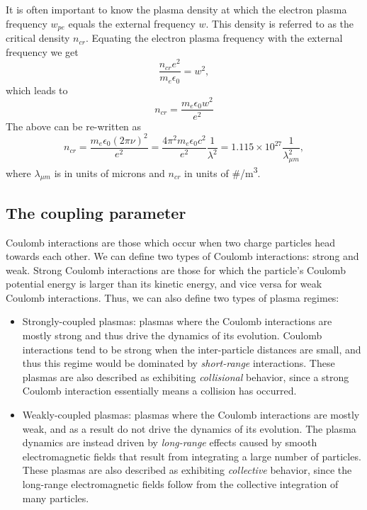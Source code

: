 \documentclass[a4paper,11pt]{report}
\begin{document}
It is often important to know the plasma density at which the electron plasma frequency $w_{pe}$ equals the external frequency $w$. This density is referred to as the critical density $n_{cr}$. Equating the electron plasma frequency with the external frequency we get
\begin{equation*}
    \frac{n_{cr} e^2}{m_e \epsilon_0} = w^2,
\end{equation*}
which leads to
\begin{equation}
    \label{eq:plas_freq_crit_den}
    n_{cr} = \frac{m_e \epsilon_0 w^2}{e^2}
\end{equation}
The above can be re-written as
\begin{equation*}
    n_{cr} = \frac{m_e \epsilon_0 (2 \pi \nu)^2}{e^2} = \frac{4 \pi^2 m_e \epsilon_0 c^2}{e^2} \frac{1}{\lambda^2} = 1.115 \times 10^{27} \frac{1}{\lambda_{\mu m}^2},
\end{equation*}
where $\lambda_{\mu m}$ is in units of microns and $n_{cr}$ in units of \#/m\textsuperscript{3}.

\subsection{The coupling parameter}

Coulomb interactions are those which occur when two charge particles head towards each other. We can define two types of Coulomb interactions: strong and weak. Strong Coulomb interactions are those for which the particle's Coulomb potential energy is larger than its kinetic energy, and vice versa for weak Coulomb interactions. Thus, we can also define two types of plasma regimes:
\begin{itemize}
    \item Strongly-coupled plasmas: plasmas where the Coulomb interactions are mostly strong and thus drive the dynamics of its evolution. Coulomb interactions tend to be strong when the inter-particle distances are small, and thus this regime would be dominated by \textit{short-range} interactions. These plasmas are also described as exhibiting \textit{collisional} behavior, since a strong Coulomb interaction essentially means a collision has occurred.
    \item Weakly-coupled plasmas: plasmas where the Coulomb interactions are mostly weak, and as a result do not drive the dynamics of its evolution. The plasma dynamics are instead driven by \textit{long-range} effects caused by smooth electromagnetic fields that result from integrating a large number of particles. These plasmas are also described as exhibiting \textit{collective} behavior, since the long-range electromagnetic fields follow from the collective integration of many particles.
\end{itemize}
\end{document}

